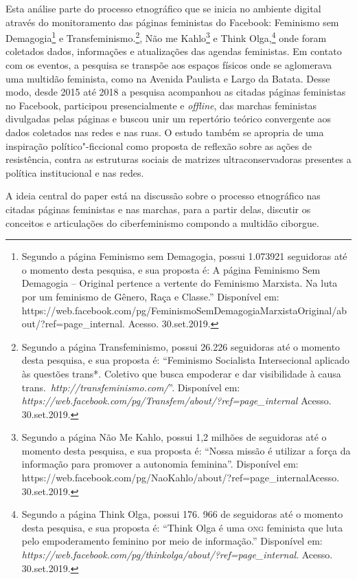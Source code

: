 \noindent{}Esta análise parte do processo etnográfico que se inicia no ambiente
digital através do monitoramento das páginas feministas do Facebook:
Feminismo sem Demagogia\footnote{Segundo a página Feminismo sem
  Demagogia, possui 1.073921 seguidoras até o momento
  desta pesquisa, e sua proposta é: A página Feminismo Sem Demagogia --
  Original pertence a vertente do Feminismo Marxista. Na luta por um
  feminismo de Gênero, Raça e Classe.''
  Disponível em:
  https://web.facebook.com/pg/FeminismoSemDemagogiaMarxistaOriginal/about/?ref=page\_internal.
  Acesso. 30.set.2019.} e Transfeminismo.\footnote{Segundo a página
  Transfeminismo, possui 26.226 seguidoras até o momento desta pesquisa,
  e sua proposta é: ``Feminismo Socialista Intersecional aplicado às
  questões trans*. Coletivo que busca empoderar e dar visibilidade à
  causa
  trans.~\emph{http://transfeminismo.com/}''.
  Disponível em:
  \emph{https://web.facebook.com/pg/Transfem/about/?ref=page\_internal}
  Acesso. 30.set.2019.}, Não me Kahlo\footnote{Segundo a página Não Me
  Kahlo, possui 1,2 milhões de seguidoras até o momento desta pesquisa,
  e sua proposta é: ``Nossa missão é utilizar a força da informação para
  promover a autonomia feminina''. Disponível em:
  https://web.facebook.com/pg/NaoKahlo/about/?ref=page\_internalAcesso.
  30.set.2019.} e Think Olga,\footnote{Segundo a página Think Olga,
  possui 176. 966 de seguidoras até o momento desta pesquisa, e sua
  proposta é: ``Think Olga é uma \textsc{ong} feminista que luta pelo
  empoderamento feminino por meio de informação.''
  Disponível em:
  \emph{https://web.facebook.com/pg/thinkolga/about/?ref=page\_internal}.
  Acesso. 30.set.2019.} onde foram coletados dados, informações e atualizações
das agendas feministas. Em contato com os eventos, a pesquisa se
transpõe aos espaços físicos onde se aglomerava uma multidão feminista,
como na Avenida Paulista e Largo da Batata. Desse modo, desde 2015 até
2018 a pesquisa acompanhou as citadas páginas feministas no Facebook,
participou presencialmente e \emph{offline}, das marchas feministas divulgadas
pelas páginas e buscou unir um repertório teórico convergente aos dados
coletados nas redes e nas ruas. O estudo também se apropria de uma
inspiração político"-ficcional como proposta de reflexão sobre as ações
de resistência, contra as estruturas sociais de matrizes
ultraconservadoras presentes a política institucional e nas redes.

A ideia central do paper está na discussão sobre o processo etnográfico
nas citadas páginas feministas e nas marchas, para a partir delas,
discutir os conceitos e articulações do ciberfeminismo compondo a
multidão ciborgue.

